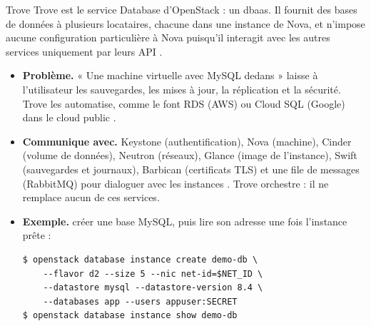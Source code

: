 \begin{definition}{Trove}
Trove est le service Database d'OpenStack : un \gls{dbaas}. Il fournit des bases de données à plusieurs locataires, chacune dans une
instance de Nova, et n'impose aucune configuration particulière à Nova puisqu'il interagit avec les autres services uniquement par
leurs API \parencite{trove-design}.
\end{definition}

\begin{itemize}
  \item \textbf{Problème.} « Une machine virtuelle avec MySQL dedans » laisse à l'utilisateur les sauvegardes, les mises à jour, la
        réplication et la sécurité. Trove les automatise, comme le font RDS (AWS) ou Cloud SQL (Google) dans le cloud public
        \parencite{trove-overview}.
  \item \textbf{Communique avec.} Keystone (authentification), Nova (machine), Cinder (volume de données), Neutron (réseaux),
        Glance (image de l'instance), Swift (sauvegardes et journaux), Barbican (certificats TLS) et une file de messages
        (RabbitMQ) pour dialoguer avec les instances \parencite{trove-design,trove-production,trove-ssl}. Trove orchestre : il ne
        remplace aucun de ces services.
  \item \textbf{Exemple.} créer une base MySQL, puis lire son adresse une fois l'instance prête :
\begin{lstlisting}[style=terminal]
$ openstack database instance create demo-db \
    --flavor d2 --size 5 --nic net-id=$NET_ID \
    --datastore mysql --datastore-version 8.4 \
    --databases app --users appuser:SECRET
$ openstack database instance show demo-db
\end{lstlisting}
\end{itemize}

